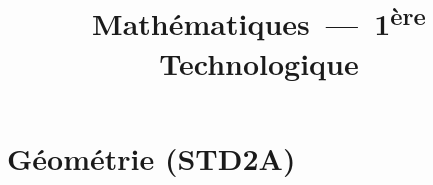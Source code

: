 \documentclass{poly}
\title{Mathématiques~---~1\textsuperscript{ère} Technologique}
\author{}
\date{\figureB{}}
\begin{document}
\maketitle
\tableofcontents
% 
% 
% 
% 
% 
% 
% 
% 
% 
% 
% 
% 
% 
% 
\part{Géométrie (STD2A)}

\end{document}
